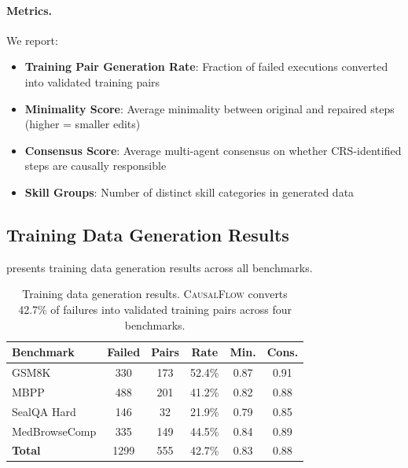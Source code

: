 \documentclass{article}
\theoremstyle{plain}
\theoremstyle{definition}
\theoremstyle{remark}
\begin{document}
\paragraph{Metrics.}
We report:
\begin{itemize}
    \item \textbf{Training Pair Generation Rate}: Fraction of failed executions converted into validated training pairs
    \item \textbf{Minimality Score}: Average minimality between original and repaired steps (higher = smaller edits)
    \item \textbf{Consensus Score}: Average multi-agent consensus on whether CRS-identified steps are causally responsible
    \item \textbf{Skill Groups}: Number of distinct skill categories in generated data
\end{itemize}

\subsection{Training Data Generation Results}

 presents training data generation results across all benchmarks.

\begin{table}[h]
  \caption{Training data generation results. \textsc{CausalFlow} converts 42.7\% of failures into validated training pairs across four benchmarks.}
  \label{tab:main_results}
  \centering
  \begin{small}
    \begin{sc}
      \begin{tabular}{lccccc}
        \toprule
        Benchmark & Failed & Pairs & Rate & Min. & Cons. \\
        \midrule
        GSM8K        & 330 & 173 & 52.4\% & 0.87 & 0.91 \\
        MBPP         & 488 & 201 & 41.2\% & 0.82 & 0.88 \\
        SealQA Hard  & 146 & 32  & 21.9\% & 0.79 & 0.85 \\
        MedBrowseComp& 335 & 149 & 44.5\% & 0.84 & 0.89 \\
        \midrule
        \textbf{Total} & 1299 & 555 & 42.7\% & 0.83 & 0.88 \\
        \bottomrule
      \end{tabular}
    \end{sc}
  \end{small}
\end{table}
\end{document}
